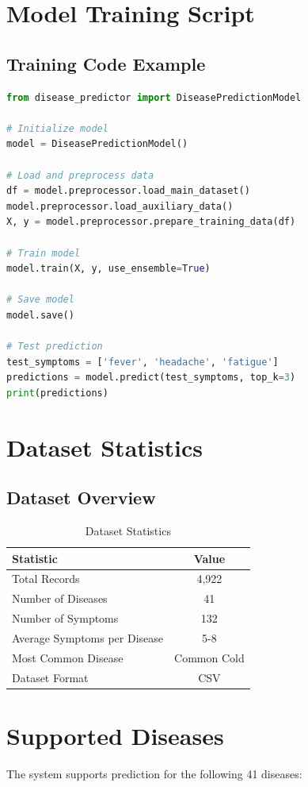 \section{Model Training Script}
\subsection{Training Code Example}
\begin{lstlisting}[language=Python, caption=Model Training Script]
from disease_predictor import DiseasePredictionModel

# Initialize model
model = DiseasePredictionModel()

# Load and preprocess data
df = model.preprocessor.load_main_dataset()
model.preprocessor.load_auxiliary_data()
X, y = model.preprocessor.prepare_training_data(df)

# Train model
model.train(X, y, use_ensemble=True)

# Save model
model.save()

# Test prediction
test_symptoms = ['fever', 'headache', 'fatigue']
predictions = model.predict(test_symptoms, top_k=3)
print(predictions)
\end{lstlisting}

\section{Dataset Statistics}
\subsection{Dataset Overview}
\begin{table}[H]
\centering
\caption{Dataset Statistics}
\begin{tabular}{|l|c|}
\hline
\textbf{Statistic} & \textbf{Value} \\
\hline
Total Records & 4,922 \\
\hline
Number of Diseases & 41 \\
\hline
Number of Symptoms & 132 \\
\hline
Average Symptoms per Disease & 5-8 \\
\hline
Most Common Disease & Common Cold \\
\hline
Dataset Format & CSV \\
\hline
\end{tabular}
\end{table}

\section{Supported Diseases}
The system supports prediction for the following 41 diseases:

